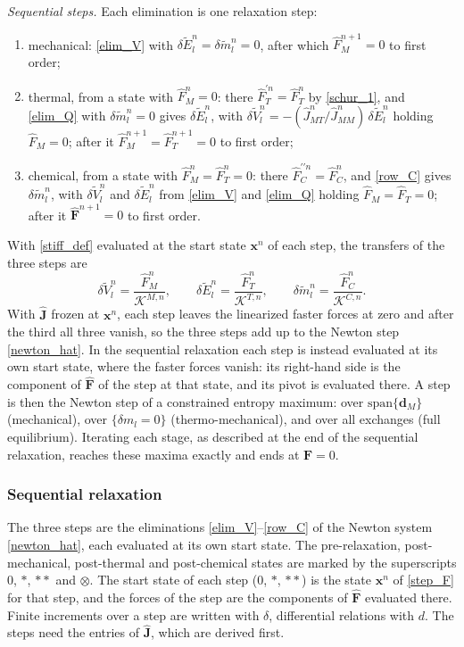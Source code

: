\emph{Sequential steps.} Each elimination is one relaxation step:
\begin{enumerate}
\item mechanical: \eqref{elim_V} with $\delta\tilde{E}_l^n=\delta\tilde{m}_l^n=0$, after which $\hat{F}_M^{n+1}=0$ to first order;
\item thermal, from a state with $\hat{F}_M^n=0$: there $\hat{F}^{\prime n}_T=\hat{F}^n_T$ by \eqref{schur_1}, and \eqref{elim_Q} with $\delta\tilde{m}_l^n=0$ gives $\delta\tilde{E}_l^n$, with $\delta\tilde{V}_l^n=-(\hat{J}^n_{MT}/\hat{J}^n_{MM})\,\delta\tilde{E}_l^n$ holding $\hat{F}_M=0$; after it $\hat{F}_M^{n+1}=\hat{F}_T^{n+1}=0$ to first order;
\item chemical, from a state with $\hat{F}_M^n=\hat{F}_T^n=0$: there $\hat{F}^{\prime\prime n}_C=\hat{F}^n_C$, and \eqref{row_C} gives $\delta\tilde{m}_l^n$, with $\delta\tilde{V}_l^n$ and $\delta\tilde{E}_l^n$ from \eqref{elim_V} and \eqref{elim_Q} holding $\hat{F}_M=\hat{F}_T=0$; after it $\hat{\boldsymbol{F}}^{n+1}=0$ to first order.
\end{enumerate}
With \eqref{stiff_def} evaluated at the start state $\boldsymbol{x}^n$ of each step, the transfers of the three steps are
\begin{equation}\label{step_F}
\delta\tilde{V}_l^n=\frac{\hat{F}_M^n}{\mathcal{K}^{M,n}},\qquad \delta\tilde{E}_l^n=\frac{\hat{F}_T^n}{\mathcal{K}^{T,n}},\qquad \delta\tilde{m}_l^n=\frac{\hat{F}_C^n}{\mathcal{K}^{C,n}}.
\end{equation}
With $\hat{\boldsymbol{J}}$ frozen at $\boldsymbol{x}^n$, each step leaves the linearized faster forces at zero and after the third all three vanish, so the three steps add up to the Newton step \eqref{newton_hat}. In the sequential relaxation each step is instead evaluated at its own start state, where the faster forces vanish: its right-hand side is the component of $\hat{\boldsymbol{F}}$ of the step at that state, and its pivot is evaluated there. A step is then the Newton step of a constrained entropy maximum: over $\mathrm{span}\{\boldsymbol{d}_M\}$ (mechanical), over $\{\delta m_l=0\}$ (thermo-mechanical), and over all exchanges (full equilibrium). Iterating each stage, as described at the end of the sequential relaxation, reaches these maxima exactly and ends at $\boldsymbol{F}=0$.

\subsubsection{Sequential relaxation}
The three steps are the eliminations \eqref{elim_V}--\eqref{row_C} of the Newton system \eqref{newton_hat}, each evaluated at its own start state. The pre-relaxation, post-mechanical, post-thermal and post-chemical states are marked by the superscripts $0$, $*$, $**$ and $\otimes$. The start state of each step ($0$, $*$, $**$) is the state $\boldsymbol{x}^n$ of \eqref{step_F} for that step, and the forces of the step are the components of $\hat{\boldsymbol{F}}$ evaluated there. Finite increments over a step are written with $\delta$, differential relations with $d$. The steps need the entries of $\hat{\boldsymbol{J}}$, which are derived first.

